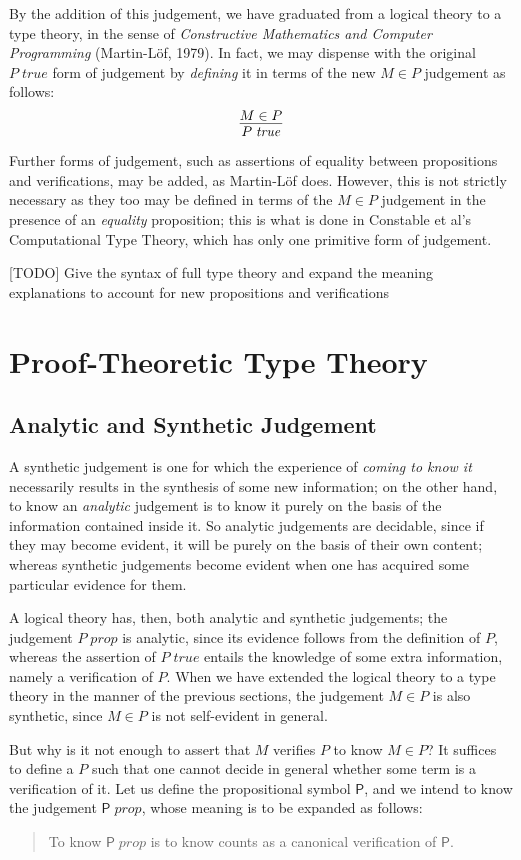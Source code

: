 \documentclass{amsart}
\theoremstyle{definition}
\theoremstyle{remark}
\numberwithin{equation}{section}
\newcommand\isprop[1]{\ensuremath{#1\;\mathit{prop}}}
\newcommand\istrue[1]{\ensuremath{#1\;\mathit{true}}}
\newcommand\ver[2]{\ensuremath{#1\in#2}}
\begin{document}
By the addition of this judgement, we have graduated from a logical theory to a
type theory, in the sense of \emph{Constructive Mathematics and Computer
Programming} (Martin-L\"of, 1979). In fact, we may dispense with the original
\istrue{P} form of judgement by \emph{defining} it in terms of the new
\ver{M}{P} judgement as follows:
\[
  \infer{
    \istrue{P}
  }{
    \ver{M}{P}
  }
\]

Further forms of judgement, such as assertions of equality between propositions
and verifications, may be added, as Martin-L\"of does. However, this is not
strictly necessary as they too may be defined in terms of the $\ver{M}{P}$
judgement in the presence of an \emph{equality} proposition; this is what is
done in Constable et al's Computational Type Theory, which has only one
primitive form of judgement.

[TODO] Give the syntax of full type theory and expand the meaning explanations
to account for new propositions and verifications


\section{Proof-Theoretic Type Theory}

\subsection{Analytic and Synthetic Judgement}

A synthetic judgement is one for which the experience of \emph{coming to know
it} necessarily results in the synthesis of some new information; on the other
hand, to know an \emph{analytic} judgement is to know it purely on the basis of
the information contained inside it. So analytic judgements are decidable,
since if they may become evident, it will be purely on the basis of their own
content; whereas synthetic judgements become evident when one has acquired some
particular evidence for them.

A logical theory has, then, both analytic and synthetic judgements; the
judgement \isprop{P} is analytic, since its evidence follows from the
definition of $P$, whereas the assertion of \istrue{P} entails the knowledge of
some extra information, namely a verification of $P$. When we have extended the
logical theory to a type theory in the manner of the previous sections, the
judgement \ver{M}{P} is also synthetic, since \ver{M}{P} is not self-evident in
general.

But why is it not enough to assert that $M$ verifies $P$ to know \ver{M}{P}? It
suffices to define a $P$ such that one cannot decide in general whether some
term is a verification of it. Let us define the propositional symbol
$\mathsf{P}$, and we intend to know the judgement \isprop{\mathsf{P}}, whose
meaning is to be expanded as follows:
\begin{quote}
  To know \isprop{\mathsf{P}} is to know counts as a canonical verification of $\mathsf{P}$.
\end{quote}
\end{document}
